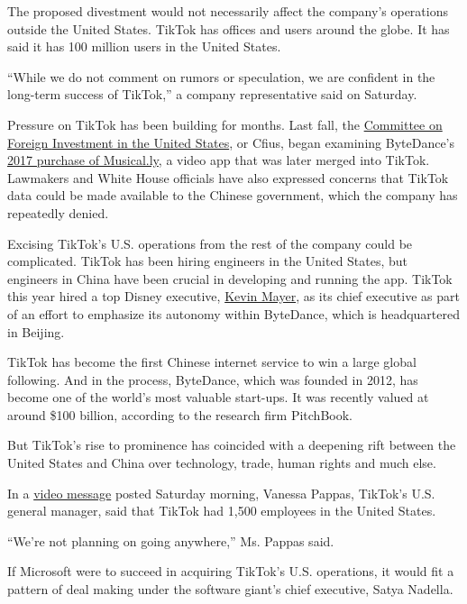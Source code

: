 The proposed divestment would not necessarily affect the company's
operations outside the United States. TikTok has offices and users
around the globe. It has said it has 100 million users in the United
States.

``While we do not comment on rumors or speculation, we are confident in
the long-term success of TikTok,'' a company representative said on
Saturday.

Pressure on TikTok has been building for months. Last fall, the
\href{https://www.nytimes3xbfgragh.onion/2019/11/01/technology/tiktok-national-security-review.html}{Committee
on Foreign Investment in the United States}, or Cfius, began examining
ByteDance's
\href{https://www.nytimes3xbfgragh.onion/2017/11/10/business/dealbook/musically-sold-app-video.html}{2017
purchase of Musical.ly}, a video app that was later merged into TikTok.
Lawmakers and White House officials have also expressed concerns that
TikTok data could be made available to the Chinese government, which the
company has repeatedly denied.

Excising TikTok's U.S. operations from the rest of the company could be
complicated. TikTok has been hiring engineers in the United States, but
engineers in China have been crucial in developing and running the app.
TikTok this year hired a top Disney executive,
\href{https://www.nytimes3xbfgragh.onion/2020/05/18/business/media/tiktok-ceo-kevin-mayer.html}{Kevin
Mayer}, as its chief executive as part of an effort to emphasize its
autonomy within ByteDance, which is headquartered in Beijing.

TikTok has become the first Chinese internet service to win a large
global following. And in the process, ByteDance, which was founded in
2012, has become one of the world's most valuable start-ups. It was
recently valued at around \$100 billion, according to the research firm
PitchBook.

But TikTok's rise to prominence has coincided with a deepening rift
between the United States and China over technology, trade, human rights
and much else.

In a
\href{https://twitter.com/tiktok_us/status/1289565422350553091}{video
message} posted Saturday morning, Vanessa Pappas, TikTok's U.S. general
manager, said that TikTok had 1,500 employees in the United States.

``We're not planning on going anywhere,'' Ms. Pappas said.

If Microsoft were to succeed in acquiring TikTok's U.S. operations, it
would fit a pattern of deal making under the software giant's chief
executive, Satya Nadella.

